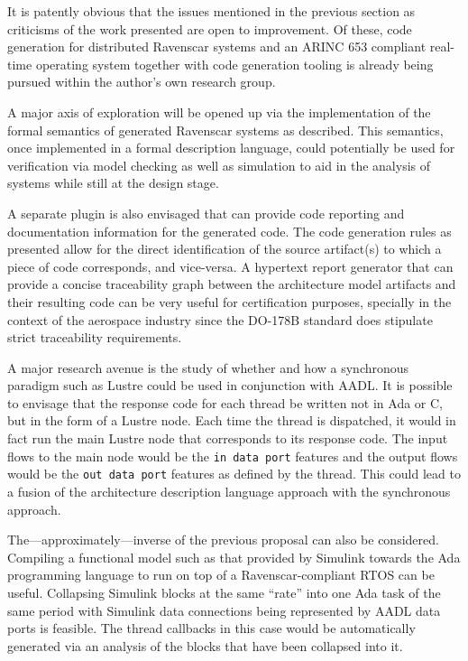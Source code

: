 It is patently obvious that the issues mentioned in the previous
section as criticisms of the work presented are open to
improvement. Of these, code generation for distributed Ravenscar
systems and an ARINC 653 compliant real-time operating system together
with code generation tooling is already being pursued within the
author's own research group.

A major axis of exploration will be opened up via the implementation
of the formal semantics of generated Ravenscar systems as
described. This semantics, once implemented in a formal description
language, could potentially be used for verification via model
checking as well as simulation to aid in the analysis of systems while
still at the design stage.

A separate plugin is also envisaged that can provide code reporting and
documentation information for the generated code. The code generation
rules as presented allow for the direct identification of the source
artifact(s) to which a piece of code corresponds, and vice-versa. A
hypertext report generator that can provide a concise traceability
graph between the architecture model artifacts and their resulting
code can be very useful for certification purposes, specially in the
context of the aerospace industry since the DO-178B standard does
stipulate strict traceability requirements.

A major research avenue is the study of whether and how a synchronous
paradigm such as Lustre could be used in conjunction with AADL. It is
possible to envisage that the response code for each thread be written
not in Ada or C, but in the form of a Lustre node. Each time the
thread is dispatched, it would in fact run the main Lustre node that
corresponds to its response code. The input flows to the main node
would be the \texttt{in data port} features and the output flows would
be the \texttt{out data port} features as defined by the thread. This
could lead to a fusion of the architecture description language
approach with the synchronous approach.

The---approximately---inverse of the previous proposal can also be
considered. Compiling a functional model such as that provided by
Simulink towards the Ada programming language to run on top of a
Ravenscar-compliant RTOS can be useful. Collapsing Simulink blocks at
the same ``rate'' into one Ada task of the same period with Simulink
data connections being represented by AADL data ports is feasible. The
thread callbacks in this case would be automatically generated via an
analysis of the blocks that have been collapsed into it.

